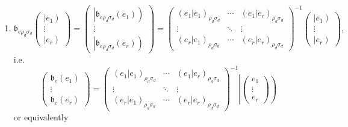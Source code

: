 \documentclass[aps,preprint]{revtex4}
\begin{document}
\begin{enumerate}
\begin{enumerate}
\item 
\begin{equation}
\mathfrak{b}_{e\rho _{d}\sigma _{d}}\left( 
\begin{array}{c}
\left\vert e_{1}\right) \\ 
\vdots \\ 
\left\vert e_{r}\right)%
\end{array}%
\right) =\left( 
\begin{array}{c}
\left\vert \mathfrak{b}_{e\rho _{d}\sigma _{d}}\left( e_{1}\right) \right)
\\ 
\vdots \\ 
\left\vert \mathfrak{b}_{e\rho _{d}\sigma _{d}}\left( e_{r}\right) \right)%
\end{array}%
\right) =\left( 
\begin{array}{ccc}
\left( \left. e_{1}\right\vert e_{1}\right) _{\rho _{d}\sigma _{d}} & \cdots
& \left( \left. e_{1}\right\vert e_{r}\right) _{\rho _{d}\sigma _{d}} \\ 
\vdots & \ddots & \vdots \\ 
\left( \left. e_{r}\right\vert e_{1}\right) _{\rho _{d}\sigma _{d}} & \cdots
& \left( \left. e_{r}\right\vert e_{r}\right) _{\rho _{d}\sigma _{d}}%
\end{array}%
\right) ^{\boldsymbol{-}1}\left( 
\begin{array}{c}
\left\vert e_{1}\right) \\ 
\vdots \\ 
\left\vert e_{r}\right)%
\end{array}%
\right) ,
\end{equation}%
i.e. 
\begin{equation}
\left( 
\begin{array}{c}
\mathfrak{b}_{e}\left( e_{1}\right) \\ 
\vdots \\ 
\mathfrak{b}_{e}\left( e_{r}\right)%
\end{array}%
\right) =\left( 
\begin{array}{ccc}
\left( \left. e_{1}\right\vert e_{1}\right) _{\rho _{d}\sigma _{d}} & \cdots
& \left( \left. e_{1}\right\vert e_{r}\right) _{\rho _{d}\sigma _{d}} \\ 
\vdots & \ddots & \vdots \\ 
\left( \left. e_{r}\right\vert e_{1}\right) _{\rho _{d}\sigma _{d}} & \cdots
& \left( \left. e_{r}\right\vert e_{r}\right) _{\rho _{d}\sigma _{d}}%
\end{array}%
\right) ^{\boldsymbol{-}1}\left\vert \left( 
\begin{array}{c}
e_{1} \\ 
\vdots \\ 
e_{r}%
\end{array}%
\right) \right)
\end{equation}%
or equivalently


\end{enumerate}
\end{enumerate}
\end{document}
